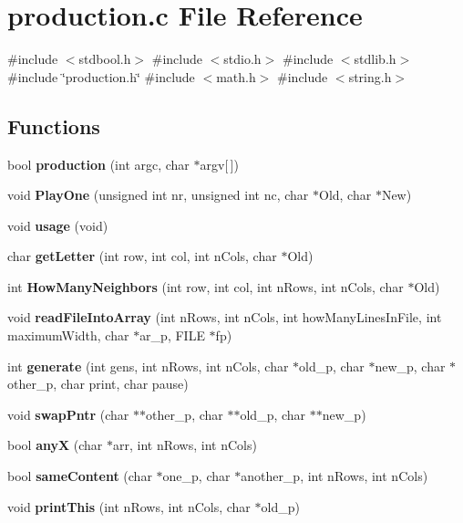 \section{production.\+c File Reference}
\label{production_8c}
{\ttfamily \#include $<$stdbool.\+h$>$}\newline
{\ttfamily \#include $<$stdio.\+h$>$}\newline
{\ttfamily \#include $<$stdlib.\+h$>$}\newline
{\ttfamily \#include \char`\"{}production.\+h\char`\"{}}\newline
{\ttfamily \#include $<$math.\+h$>$}\newline
{\ttfamily \#include $<$string.\+h$>$}\newline
\subsection*{Functions}
\begin{DoxyCompactItemize}
\item 
bool \textbf{ production} (int argc, char $\ast$argv[$\,$])
\item 
void \textbf{ Play\+One} (unsigned int nr, unsigned int nc, char $\ast$Old, char $\ast$New)
\item 
void \textbf{ usage} (void)
\item 
char \textbf{ get\+Letter} (int row, int col, int n\+Cols, char $\ast$Old)
\item 
int \textbf{ How\+Many\+Neighbors} (int row, int col, int n\+Rows, int n\+Cols, char $\ast$Old)
\item 
void \textbf{ read\+File\+Into\+Array} (int n\+Rows, int n\+Cols, int how\+Many\+Lines\+In\+File, int maximum\+Width, char $\ast$ar\+\_\+p, F\+I\+LE $\ast$fp)
\item 
int \textbf{ generate} (int gens, int n\+Rows, int n\+Cols, char $\ast$old\+\_\+p, char $\ast$new\+\_\+p, char $\ast$other\+\_\+p, char print, char pause)
\item 
void \textbf{ swap\+Pntr} (char $\ast$$\ast$other\+\_\+p, char $\ast$$\ast$old\+\_\+p, char $\ast$$\ast$new\+\_\+p)
\item 
bool \textbf{ anyX} (char $\ast$arr, int n\+Rows, int n\+Cols)
\item 
bool \textbf{ same\+Content} (char $\ast$one\+\_\+p, char $\ast$another\+\_\+p, int n\+Rows, int n\+Cols)
\item 
void \textbf{ print\+This} (int n\+Rows, int n\+Cols, char $\ast$old\+\_\+p)
\end{DoxyCompactItemize}


